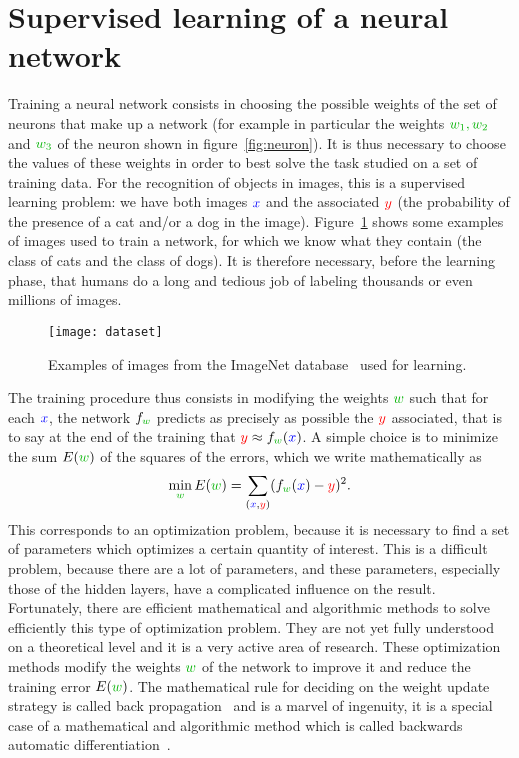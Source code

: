 \section{Supervised learning of a neural network}

Training a neural network consists in choosing the  possible weights of the set of neurons that make up a network (for example in particular the weights $\mygreen{w_1, w_2}$ and $\mygreen{w_3}$ of the neuron shown in figure~\ref{fig:neuron}).
%
It is thus necessary to choose the values of these weights in order to best solve the task studied on a set of training data.
%
For the recognition of objects in images, this is a supervised learning problem: we have both images ${\color{blue} x}$ and the associated ${\color{red} y}$ (the probability of the presence of a cat and/or a dog in the image).
%
Figure~\ref{fig:dataset} shows some examples of images used to train a network, for which we know what they contain (the class of cats and the class of dogs).
%
It is therefore necessary, before the learning phase, that humans do a long and tedious job of labeling thousands or even millions of images.


\begin{figure}\centering
	\texttt{[image: dataset]}
\caption{\label{fig:dataset} 
Examples of images from the ImageNet database~\cite{deng2009imagenet} used for learning. }
\end{figure}

The training procedure thus consists in modifying the weights $\mygreen{w}$ such that for each ${\color{blue} x}$, the network $f_{\mygreen{w}}$ predicts as precisely as possible the ${\color{red} y}$ associated, that is to say at the end of the training that ${\color{red} y} \approx f_{\mygreen{w}}({\color{blue} x})$.
%
A simple choice is to minimize the sum $E(\mygreen{w})$ of the squares of the errors, which we write mathematically as
$$
	\min_{\mygreen{w}} E(\mygreen{w}) = \sum_{({\color{blue} x}, {\color{red} y})} (f_{\mygreen{w}}({\color{blue} x}) - {\color{red} y})^2.
$$
%
This corresponds to an optimization problem, because it is necessary to find a set of parameters which optimizes a certain quantity of interest.
%
This is a difficult problem, because there are a lot of parameters, and these parameters, especially those of the hidden layers, have a complicated influence on the result.
%
Fortunately, there are efficient mathematical and algorithmic methods to solve efficiently this type of optimization problem. They are not yet fully understood on a theoretical level and it is a very active area of research.
%
These optimization methods modify the weights $\mygreen{w}$ of the network to improve it and reduce the training error $E(\mygreen{w})$. The mathematical rule for deciding on the weight update strategy is called back propagation~\cite{rumelhart1986learning} and is a marvel of ingenuity, it is a special case of a mathematical and algorithmic method which is called backwards automatic differentiation~\cite{linnainmaa1976taylor}.

